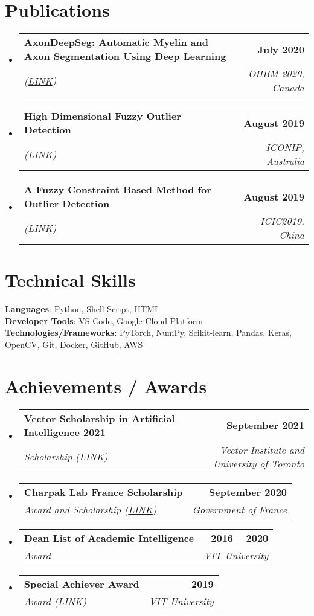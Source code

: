 \documentclass[letterpaper,11pt]{article}
\makeatletter
\newcommand{\resumeSubheading}[4]{
  \vspace{-2pt}\item
    \begin{tabular*}{1.0\textwidth}[t]{l@{\extracolsep{\fill}}r}
      \textbf{#1} & \textbf{\small #2} \\
      \textit{\small#3} & \textit{\small #4} \\
    \end{tabular*}\vspace{-7pt}
}
\newcommand{\resumeSubHeadingListStart}{\begin{itemize}[leftmargin=0.0in, label={}]}
\newcommand{\resumeSubHeadingListEnd}{\end{itemize}}
\makeatother
\begin{document}
\section{Publications}
    \resumeSubHeadingListStart
        \resumeSubheading{AxonDeepSeg: Automatic Myelin and Axon Segmentation Using Deep Learning}{July 2020}{(\href{https://cdn-akamai.6connex.com/645/1827//ohbm2020_boudreau_FINAL_15921677822526191.pdf}{LINK})}{OHBM 2020, Canada}
 
        \resumeSubheading{High Dimensional Fuzzy Outlier Detection}{August 2019}{(\href{http://ajiips.com.au/papers/V16.1/v16n1_49-59.pdf}{LINK})}{ICONIP, Australia}


        \resumeSubheading{A Fuzzy Constraint Based Method for Outlier Detection}{August 2019}{(\href{https://link.springer.com/chapter/10.1007/978-3-030-26766-7_47}{LINK})}{ICIC2019, China}


    \resumeSubHeadingListEnd

\section{Technical Skills}
 \begin{itemize}[leftmargin=0.15in, label={}]
    \small{\item{
     \textbf{Languages}{: Python, Shell Script, HTML} \\
     \textbf{Developer Tools}{: VS Code, Google Cloud Platform} \\
     \textbf{Technologies/Frameworks}{: PyTorch, NumPy, Scikit-learn, Pandas, Keras, OpenCV, Git, Docker, GitHub, AWS} \\
    }}
 \end{itemize}
 \vspace{-16pt}



\section{Achievements / Awards}
    \resumeSubHeadingListStart
        \resumeSubheading{Vector Scholarship in Artificial Intelligence 2021}{September 2021}{Scholarship ({\href{https://vectorinstitute.ai/2021/05/10/newest-vector-ai-scholarship-recipients-join-growing-talent-pool-in-ontario/}{LINK}})}{Vector Institute and University of Toronto}
        \resumeSubheading{Charpak Lab France Scholarship}{September 2020}{Award and Scholarship ({\href{https://www.inde.campusfrance.org/result-of-the-charpak-lab-scholarship-programme-2019}{LINK}})}{Government of France}
        \resumeSubheading{Dean List of Academic Intelligence}{2016 -- 2020}{Award}{VIT University}
        \resumeSubheading{Special Achiever Award}{2019}{Award (\href{https://www2.slideshare.net/secret/9CIVAk7yffpwUx}{LINK})}{VIT University}
    \resumeSubHeadingListEnd
\end{document}
